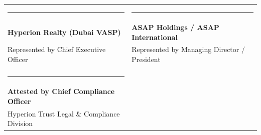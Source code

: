 \documentclass[11pt,a4paper]{article}
\begin{document}
\par\vspace{1.5cm}
\noindent
\begin{tabularx}{\textwidth}{X X}
    \rule{5cm}{0.4pt} & \rule{5cm}{0.4pt} \\
    \textbf{Hyperion Realty (Dubai VASP)} & \textbf{ASAP Holdings / ASAP International} \\
    Represented by Chief Executive Officer & Represented by Managing Director / President \\
    & \\
    \rule{5cm}{0.4pt} & \\
    \textbf{Attested by Chief Compliance Officer} & \\
    Hyperion Trust Legal \& Compliance Division &
\end{tabularx}

\makehyperionseal
\end{document}
